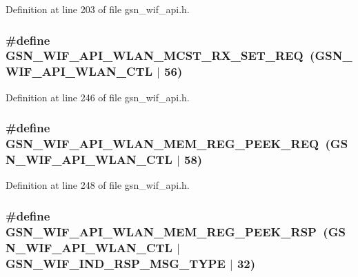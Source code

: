Definition at line 203 of file gsn\_\-wif\_\-api.h.

\hypertarget{a00606_a4397129f559035aab5a5677031c160fa}{
\subsubsection[{GSN\_\-WIF\_\-API\_\-WLAN\_\-MCST\_\-RX\_\-SET\_\-REQ}]{\setlength{\rightskip}{0pt plus 5cm}\#define GSN\_\-WIF\_\-API\_\-WLAN\_\-MCST\_\-RX\_\-SET\_\-REQ~(GSN\_\-WIF\_\-API\_\-WLAN\_\-CTL $|$ 56)}}
\label{a00606_a4397129f559035aab5a5677031c160fa}


Definition at line 246 of file gsn\_\-wif\_\-api.h.

\hypertarget{a00606_af4bb9564cfec03082d7dc43e668df779}{
\subsubsection[{GSN\_\-WIF\_\-API\_\-WLAN\_\-MEM\_\-REG\_\-PEEK\_\-REQ}]{\setlength{\rightskip}{0pt plus 5cm}\#define GSN\_\-WIF\_\-API\_\-WLAN\_\-MEM\_\-REG\_\-PEEK\_\-REQ~(GSN\_\-WIF\_\-API\_\-WLAN\_\-CTL $|$ 58)}}
\label{a00606_af4bb9564cfec03082d7dc43e668df779}


Definition at line 248 of file gsn\_\-wif\_\-api.h.

\hypertarget{a00606_a8fcbe024770baf2a76e7b3f9a85c2616}{
\subsubsection[{GSN\_\-WIF\_\-API\_\-WLAN\_\-MEM\_\-REG\_\-PEEK\_\-RSP}]{\setlength{\rightskip}{0pt plus 5cm}\#define GSN\_\-WIF\_\-API\_\-WLAN\_\-MEM\_\-REG\_\-PEEK\_\-RSP~(GSN\_\-WIF\_\-API\_\-WLAN\_\-CTL $|$ GSN\_\-WIF\_\-IND\_\-RSP\_\-MSG\_\-TYPE $|$ 32)}}
\label{a00606_a8fcbe024770baf2a76e7b3f9a85c2616}


